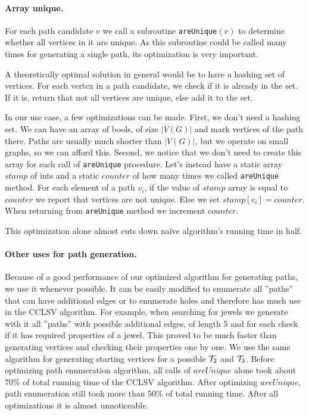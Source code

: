 \paragraph{Array unique.}

For each path candidate $v$ we call a subroutine \texttt{areUnique}$(v)$ to determine whether all vertices in it are unique. As this subroutine could be called many times for generating a single path, its optimization is very important.

A theoretically optimal solution in general would be to have a hashing set of vertices. For each vertex in a path candidate, we check if it is already in the set. If it is, return that not all vertices are unique, else add it to the set.

In our use case, a few optimizations can be made. First, we don't need a hashing set. We can have an array of bools, of size $|V(G)|$ and mark vertices of the path there. Paths are usually much shorter than $|V(G)|$, but we operate on small graphs, so we can afford this. Second, we notice that we don't need to create this array for each call of \texttt{areUnique} procedure. Let's instead have a static array $stamp$ of ints and a static $counter$ of how many times we called \texttt{areUnique} method. For each element of a path $v_i$, if the value of $stamp$ array is equal to $counter$ we report that vertices are not unique. Else we set $stamp[v_i] = counter$. When returning from \texttt{areUnique} method we increment $counter$.

This optimization alone almost cuts down na\"ive algorithm's running time in half.

\paragraph{Other uses for path generation.}
\label{sec:usesGeneration}

Because of a good performance of our optimized algorithm for generating paths, we use it whenever possible. It can be easily modified to enumerate all ''paths'' that can have additional edges or to enumerate holes and therefore has much use in the CCLSV algorithm. For example, when searching for jewels we generate with it all ''paths'' with possible additional edges, of length 5 and for each check if it has required properties of a jewel. This proved to be much faster than generating vertices and checking their properties one by one. We use the same algorithm for generating starting vertices for a possible $\mathcal{T}_2$ and $\mathcal{T}_3$. Before optimizing path enumeration algorithm, all calls of $areUnique$ alone took about 70\% of total running time of the CCLSV algorithm. After optimizing $areUnique$, path enumeration still took more than 50\% of total running time. After all optimizations it is almost unnoticeable.


